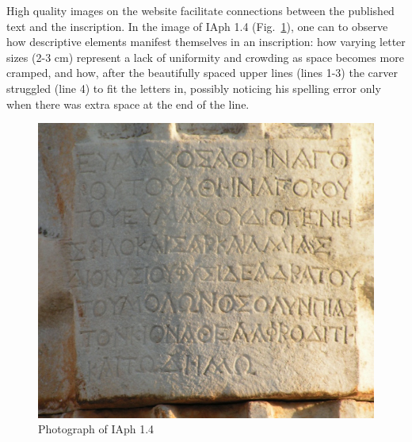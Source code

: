 \documentclass[amsthm,ebook]{saparticle}
\begin{document}
High quality images on the website facilitate connections between the published text and the inscription. In the image
of IAph 1.4 (Fig.~\ref{fig:2}), one can to observe how descriptive elements manifest themselves in an
inscription: how varying letter sizes (2-3 cm) represent a lack of uniformity and crowding as space becomes more
cramped, and how, after the beautifully spaced upper lines (lines 1-3) the carver struggled (line 4) to fit the letters
in, possibly noticing his spelling error only when there was extra space at the end of the line. \ 




\begin{figure}[!bp]
\centering
 \includegraphics[width=\columnwidth]{PaperproposalforEAGLEfinal-img002.jpg}
\caption{Photograph of IAph 1.4}
\label{fig:2}
\end{figure}
\end{document}

